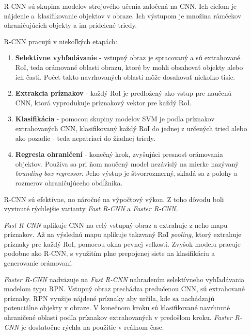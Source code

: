         \ac{R-CNN} sú skupina modelov strojového učenia zaločená na \ac{CNN}. Ich cieľom je nájdenie a~klasifikovanie objektov v obraze. Ich výstupom je množina rámčekov ohraničujúcich objekty a im pridelené triedy.

        \ac{R-CNN} pracujú v niekoľkých etapách:
        \begin{enumerate}
            \item \textbf{Selektívne vyhľadávanie} - vstupný obraz je spracovaný a sú extrahované \ac{RoI}, teda orámované oblasti obrazu, ktoré by mohli obsahovať objekty alebo ich časti. Počet takto navrhovaných oblastí môže dosahovať niekoľko tisíc.
            \item \textbf{Extrakcia príznakov} - každý \ac{RoI} je predložený ako vstup pre naučenú \ac{CNN}, ktorá vyprodukuje príznakový vektor pre každý \ac{RoI}.
            \item \textbf{Klasifikácia} - pomocou skupiny modelov \ac{SVM} je podľa príznakov extrahovaných \ac{CNN}, klasifikovaný každý \ac{RoI} do jednej z určených tried alebo ako pozadie - teda nepatriaci do žiadnej triedy.
            \item \textbf{Regresia ohraničení} - konečný krok, zvyšujúci presnosť orámovania objektov. Používa sa pri ňom naučený model nezávislý na mierke nazývaný \emph{bounding box regressor}. Jeho výstup je štvorrozmerný, skladá sa z polohy a rozmerov ohraničujúceho obdĺžnika.
        \end{enumerate}

        \ac{R-CNN} sú efektívne, no náročné na výpočtový výkon. Z toho dôvodu boli vyvinuté rýchlejšie varianty \emph{Fast R-CNN} a \emph{Faster R-CNN}.

        \emph{Fast R-CNN} aplikuje \ac{CNN} na celý vstupný obraz a extrahuje z neho mapu príznakov. Až na výslednú mapu aplikuje takzvaný \ac{RoI} \emph{pooling}, ktorý extrahuje príznaky pre každý \ac{RoI}, pomocou okna pevnej veľkosti. Zvyšok modelu pracuje podobne ako \ac{R-CNN}, s využitím plne prepojenej siete na klasifikáciu a generovanie orámovaní.

        \emph{Faster R-CNN} nadväzuje na \emph{Fast R-CNN} nahradením selektívneho vyhľadávania modelom typu \ac{RPN}. Vstupný obraz prechádza predučenou \ac{CNN}, sú extrahované príznaky. \ac{RPN} využije nájdené príznaky aby určila, kde sa nachádzajú potenciálne objekty v obraze. V konečnom kroku sú klasifikované navrhnuté ohraničené oblasti podľa príznakov extrahovaných v predošlom kroku. \emph{Faster R-CNN} je dostatočne rýchla na použitie v reálnom čase.

